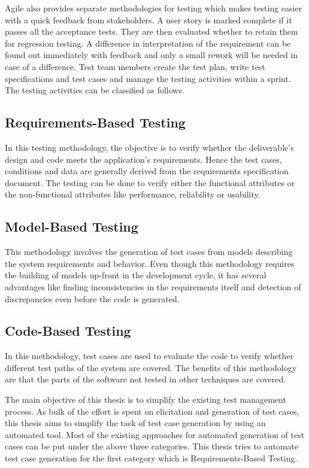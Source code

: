 Agile also provides separate methodologies for testing which makes testing easier with a quick feedback from stakeholders. A user story is marked complete if it passes all the acceptance tests. They are then evaluated whether to retain them for regression testing. A difference in interpretation of the requirement can be found out immediately with feedback and only a small rework will be needed in case of a difference. Test team members create the test plan, write test specifications and test cases and manage the testing activities within a sprint. The testing activities can be classified as follows.

\subsection{Requirements-Based Testing}
In this testing methodology, the objective is to verify whether the deliverable’s design and code meets the application’s requirements. Hence the test cases, conditions and data are generally derived from the requirements specification document. The testing can be done to verify either the functional attributes or the non-functional attributes like performance, reliability or usability. \cite{tahat2001requirement}

\subsection{Model-Based Testing}
This methodology involves the generation of test cases from models describing the system requirements and behavior. Even though this methodology requires the building of models up-front in the development cycle, it has several advantages like finding inconsistencies in the requirements itself and detection of discrepancies even before the code is generated. \cite{dias2007survey}

\subsection{Code-Based Testing}
In this methodology, test cases are used to evaluate the code to verify whether different test paths of the system are covered. The benefits of this methodology are that the parts of the software not tested in other techniques are covered. \cite{prasanna2005survey}

The main objective of this thesis is to simplify the existing test management process. As bulk of the effort is spent on elicitation and generation of test cases, this thesis aims to simplify the task of test case generation by using an automated tool. Most of the existing approaches for automated generation of test cases can be put under the above three categories. This thesis tries to automate test case generation for the first category which is Requirements-Based Testing.

